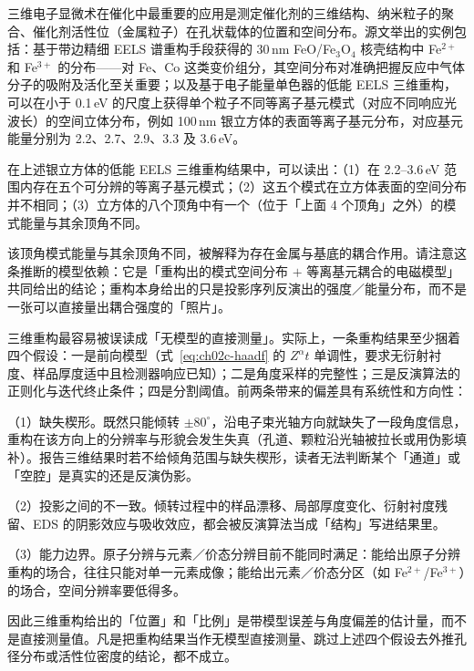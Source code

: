 三维电子显微术在催化中最重要的应用是测定催化剂的三维结构、纳米粒子的聚合、催化剂活性位（金属粒子）在孔状载体的位置和空间分布。源文举出的实例包括：基于带边精细 EELS 谱重构手段获得的 30\,nm FeO/Fe$_3$O$_4$ 核壳结构中 Fe$^{2+}$ 和 Fe$^{3+}$ 的分布——对 Fe、Co 这类变价组分，其空间分布对准确把握反应中气体分子的吸附及活化至关重要；以及基于电子能量单色器的低能 EELS 三维重构，可以在小于 0.1\,eV 的尺度上获得单个粒子不同等离子基元模式（对应不同响应光波长）的空间立体分布，例如 100\,nm 银立方体的表面等离子基元分布，对应基元能量分别为 2.2、2.7、2.9、3.3 及 3.6\,eV。

\begin{obs}
在上述银立方体的低能 EELS 三维重构结果中，可以读出：（1）在 2.2--3.6\,eV 范围内存在五个可分辨的等离子基元模式；（2）这五个模式在立方体表面的空间分布并不相同；（3）立方体的八个顶角中有一个（位于「上面 4 个顶角」之外）的模式能量与其余顶角不同。
\end{obs}

\begin{infer}
该顶角模式能量与其余顶角不同，被解释为存在金属与基底的耦合作用。请注意这条推断的模型依赖：它是「重构出的模式空间分布 $+$ 等离基元耦合的电磁模型」共同给出的结论；重构本身给出的只是投影序列反演出的强度／能量分布，而不是一张可以直接量出耦合强度的「照片」。
\end{infer}

\begin{pitfall}
三维重构最容易被误读成「无模型的直接测量」。实际上，一条重构结果至少捆着四个假设：一是前向模型（式~\eqref{eq:ch02c-haadf} 的 $Z^\alpha t$ 单调性，要求无衍射衬度、样品厚度适中且检测器响应已知）；二是角度采样的完整性；三是反演算法的正则化与迭代终止条件；四是分割阈值。前两条带来的偏差具有系统性和方向性：

（1）缺失楔形。既然只能倾转 $\pm 80^\circ$，沿电子束光轴方向就缺失了一段角度信息，重构在该方向上的分辨率与形貌会发生失真（孔道、颗粒沿光轴被拉长或用伪影填补）。报告三维结果时若不给倾角范围与缺失楔形，读者无法判断某个「通道」或「空腔」是真实的还是反演伪影。

（2）投影之间的不一致。倾转过程中的样品漂移、局部厚度变化、衍射衬度残留、EDS 的阴影效应与吸收效应，都会被反演算法当成「结构」写进结果里。

（3）能力边界。原子分辨与元素／价态分辨目前不能同时满足：能给出原子分辨重构的场合，往往只能对单一元素成像；能给出元素／价态分区（如 Fe$^{2+}$/Fe$^{3+}$）的场合，空间分辨率要低得多。

因此三维重构给出的「位置」和「比例」是带模型误差与角度偏差的估计量，而不是直接测量值。凡是把重构结果当作无模型直接测量、跳过上述四个假设去外推孔径分布或活性位密度的结论，都不成立。
\end{pitfall}

